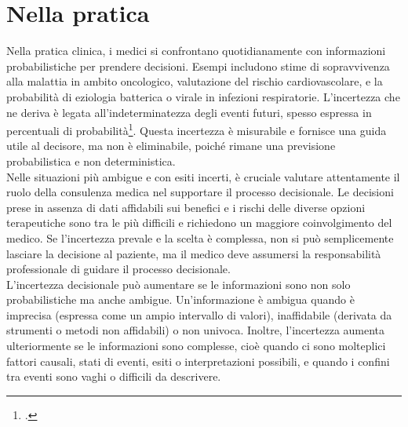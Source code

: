 \section{Nella pratica}
Nella pratica clinica, i medici si confrontano quotidianamente con informazioni probabilistiche per prendere decisioni. Esempi includono stime di sopravvivenza alla malattia in ambito oncologico, valutazione del rischio cardiovascolare, e la probabilità di eziologia batterica o virale in infezioni respiratorie. L'incertezza che ne deriva è legata all'indeterminatezza degli eventi futuri, spesso espressa in percentuali di probabilità\footcite{womak:recenti-progressi-medicina}. Questa incertezza è misurabile e fornisce una guida utile al decisore, ma non è eliminabile, poiché rimane una previsione probabilistica e non deterministica.\\
Nelle situazioni più ambigue e con esiti incerti, è cruciale valutare attentamente il ruolo della consulenza medica nel supportare il processo decisionale. Le decisioni prese in assenza di dati affidabili sui benefici e i rischi delle diverse opzioni terapeutiche sono tra le più difficili e richiedono un maggiore coinvolgimento del medico. Se l'incertezza prevale e la scelta è complessa, non si può semplicemente lasciare la decisione al paziente, ma il medico deve assumersi la responsabilità professionale di guidare il processo decisionale.\\

L'incertezza decisionale può aumentare se le informazioni sono non solo probabilistiche ma anche ambigue. Un'informazione è ambigua quando è imprecisa (espressa come un ampio intervallo di valori), inaffidabile (derivata da strumenti o metodi non affidabili) o non univoca. Inoltre, l'incertezza aumenta ulteriormente se le informazioni sono complesse, cioè quando ci sono molteplici fattori causali, stati di eventi, esiti o interpretazioni possibili, e quando i confini tra eventi sono vaghi o difficili da descrivere.\\


